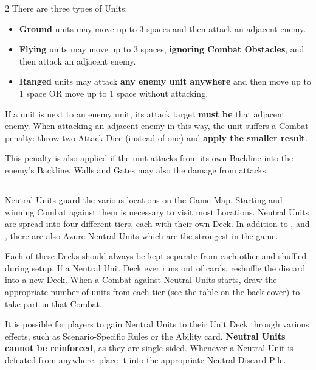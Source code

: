 \begin{multicols}{2}
There are three types of Units:
\begin{itemize}
  \item \textbf{Ground}  units may move up to 3 spaces and then attack an adjacent enemy.
  \item \textbf{Flying}  units may move up to 3 spaces, \textbf{ignoring Combat Obstacles}, and then attack an adjacent enemy.
  \item \textbf{Ranged}  units may attack \textbf{any enemy unit anywhere} and then move up to 1 space OR move up to 1 space without attacking.
\end{itemize}
If a  unit is next to an enemy unit, its attack target \textbf{must be} that adjacent enemy.
When attacking an adjacent enemy in this way, the  unit suffers a Combat penalty: throw two Attack Dice (instead of one) and \textbf{apply the smaller result}.\par
This penalty is also applied if the  unit attacks from its own Backline into the enemy's Backline.
Walls and Gates may also  the damage from   attacks.

\subsection*{}
Neutral Units guard the various locations on the Game Map.
Starting and winning Combat against them is necessary to visit most Locations.
Neutral Units are spread into four different tiers, each with their own Deck.
In addition to ,  and , there are also Azure  Neutral Units which are the strongest in the game.\par
Each of these Decks should always be kept separate from each other and shuffled during setup.
If a Neutral Unit Deck ever runs out of cards, reshuffle the discard into a new Deck.
When a Combat against Neutral Units starts, draw the appropriate number of units from each tier (see the \hyperlink{Difficulty Table}{table} on the back cover) to take part in that Combat.\par
It is possible for players to gain Neutral Units to their Unit Deck through various effects, such as Scenario-Specific Rules or the  Ability card.
\textbf{Neutral Units cannot be reinforced}, as they are single sided.
Whenever a Neutral Unit is defeated from anywhere, place it into the appropriate Neutral Discard Pile.\par


\end{multicols}

